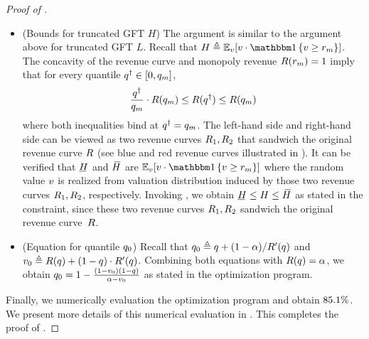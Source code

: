\begin{proof}[Proof of ]
\begin{itemize}
        \item (Bounds for truncated GFT $H$) The argument is similar to the argument above for truncated GFT $L$. Recall that $H \triangleq \expect[\val]{\val\cdot \indicator{\val \geq \optreserve}}$. The concavity of the revenue curve and monopoly revenue $R(r_m) = 1$ imply that for every quantile $q^\dagger \in [0, q_m]$,
        \begin{align*}
            \frac{q^\dagger}{q_m}\cdot R(q_m)
            \leq 
            R(q^\dagger) 
            \leq
             R(q_m)
        \end{align*}
        where both inequalities bind at $q^\dagger = q_m$. The left-hand side and right-hand side can be viewed as two revenue curves $R_1, R_2$ that sandwich the original revenue curve $R$ (see blue and red revenue curves illustrated in ). It can be verified that $\HUnderBar$ and $\HOverBar$ are $\expect[\val]{\val\cdot \indicator{  \val \geq\optreserve }}$ where the random value $v$ is realized from valuation distribution induced by those two revenue curves $R_1, R_2$, respectively. Invoking , we obtain $\HUnderBar\leq H \leq \HOverBar$ as stated in the constraint, since these two revenue curves $R_1, R_2$ sandwich the original revenue curve~$R$.
        \item (Equation for quantile $q_0$) Recall that  $q_0 \triangleq q + (1 - \alpha) / R'(q)$ and $v_0 \triangleq R(q) + (1-q)\cdot R'(q)$. Combining both equations with $R(q) = \alpha$, we obtain $q_0 = 1 - \frac{(1 - v_0)(1 - q)}{\alpha - v_0}$ as stated in the optimization program.
    \end{itemize}
    Finally, we numerically evaluation the optimization program and obtain ${85.1\%}$. We present more details of this numerical evaluation in . This completes the proof of .
\end{proof}

